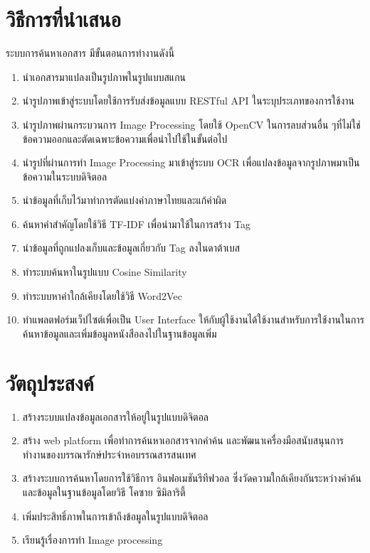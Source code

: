 \section{วิธีการที่นำเสนอ}

ระบบการค้นหาเอกสาร มีขั้นตอนการทำงานดังนี้

\begin{enumerate}
    \item นำเอกสารมาแปลงเป็นรูปภาพในรูปแบบสแกน
    \item นำรูปภาพเข้าสู่ระบบโดยใช้การรับส่งข้อมูลแบบ RESTful API ในระบุประเภทของการใช้งาน
    \item นำรูปภาพผ่านกระบวนการ Image Processing โดยใช้ OpenCV ในการลบส่วนอื่น ๆที่ไม่ใช่ข้อความออกและตัดเฉพาะข้อความเพื่อนำไปใช้ในขั้นต่อไป
    \item นำรูปที่ผ่านการทำ Image Processing มาเข้าสู่ระบบ OCR เพื่อแปลงข้อมูลจากรูปภาพมาเป็นข้อความในระบบดิจิตอล
    \item นำข้อมูลที่เก็บไว้มาทำการตัดแบ่งคำภาษาไทยและแก้คำผิด
    \item ค้นหาคำสำคัญโดยใช้วิธี TF-IDF เพื่อนำมาใช้ในการสร้าง Tag 
    \item นำข้อมูลที่ถูกแปลงเก็บและข้อมูลเกี่ยวกับ Tag ลงในดาต้าเบส 
    \item ทำระบบค้นหาในรูปแบบ Cosine Similarity 
    \item ทำระบบหาคำใกล้เคียงโดยใช้วิธี Word2Vec
    \item ทำแพลตฟอร์มเว็ปไซต์เพื่อเป็น User Interface ให้กับผู้ใช้งานได้ใช้งานสำหรับการใช้งานในการค้นหาข้อมูลและเพิ่มข้อมูลหนังสือลงไปในฐานข้อมูลเพิ่ม
\end{enumerate}
\section{วัตถุประสงค์}
\begin{enumerate}
    \item สร้างระบบแปลงข้อมูลเอกสารให้อยู่ในรูปแบบดิจิตอล
    \item สร้าง web platform เพื่อทำการค้นหาเอกสารจากคำค้น และพัฒนาเครื่องมือสนับสนุนการทำงานของบรรณารักษ์ประจำหอบรรณสารสนเทศ
    \item สร้างระบบการค้นหาโดยการใช้วิธีการ อินฟอเมชันรีทีฟวอล ซึ่งวัดความใกล้เคียงกันระหว่างคำค้นและข้อมูลในฐานข้อมูลโดยวิธี โคซาย ซิมิลาริตี้
    \item เพิ่มประสิทธิ์ภาพในการเข้าถึงข้อมูลในรูปแบบดิจิตอล
    \item เรียนรู้เรื่องการทำ Image processing
\end{enumerate}
